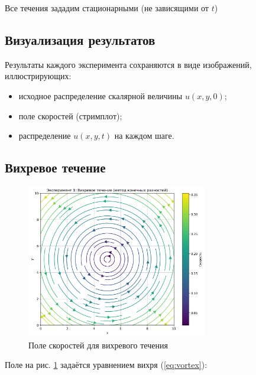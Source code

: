 Все течения зададим стационарными (не зависящими от $t$)
\subsection{Визуализация результатов}

Результаты каждого эксперимента сохраняются в виде изображений, иллюстрирующих:
\begin{itemize}
	\item исходное распределение скалярной величины \(u(x,y,0)\);
	\item поле скоростей (стримплот);
	\item распределение \(u(x,y,t)\) на каждом шаге.
\end{itemize}

\subsection{Вихревое течение}
\begin{figure}[h]
	\centering
	\includegraphics[width=0.7\textwidth]{imgs/эксперимент_1:_вихревое_течение_fd_velocity_field.png}
	\caption{Поле скоростей для вихревого течения}
	\label{fig:vortex_velocity}
\end{figure}
Поле на рис. \ref{fig:vortex_velocity} задаётся уравнением вихря (\ref{eq:vortex}):

